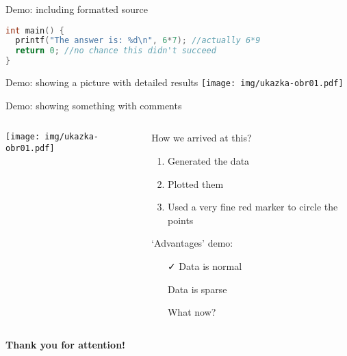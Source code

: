 \documentclass[aspectratio=169]{beamer}
\begin{document}
\begin{frame}[fragile]{Demo: including formatted source}

\begin{lstlisting}[language=C,showstringspaces=false,basicstyle=\tt\small,commentstyle=\color{green!50!black},keywordstyle=\bfseries\color{blue!50!black},stringstyle=\color{red!50!black}]
int main() {
  printf("The answer is: %d\n", 6*7); //actually 6*9
  return 0; //no chance this didn't succeed
}
\end{lstlisting}
\end{frame}

\begin{frame}{Demo: showing a picture with detailed results}
\centering
\texttt{[image: img/ukazka-obr01.pdf]}
\end{frame}

\begin{frame}{Demo: showing something with comments}
\begin{columns}
\begin{column}{0.5\textwidth}
\texttt{[image: img/ukazka-obr01.pdf]}
\end{column}
\begin{column}{0.5\textwidth}
How we arrived at this?
\begin{enumerate}
\item Generated the data
\item Plotted them
\item Used a very fine red marker to circle the points
\end{enumerate}

`Advantages' demo:

\begin{itemize}
\item[\color{green}\faCheck] Data is normal
\item[\color{red}\faTimes] Data is sparse
\item[\color{violet}\faQuestionCircle] What now?
\end{itemize}
\end{column}
\end{columns}
\end{frame}

\begin{frame}[plain]
\centering
{\Large\bfseries Thank you for attention!}


\end{frame}
\end{document}
